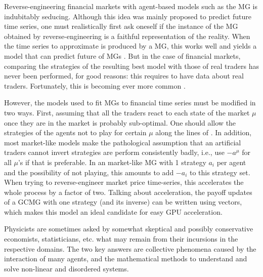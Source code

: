 \documentclass[aps,twocolumn,nofootinbib,sortedaddress,reprint]{revtex4-1}
\begin{document}
Reverse-engineering financial markets with agent-based models such as the MG is indubitably seducing. Although this idea was mainly proposed to predict future time series, one must realistically first ask oneself if the instance of the MG obtained by reverse-engineering is a faithful representation of the reality. When the time series to approximate is produced by a MG, this works well \cite{JohnsonLargeChanges} and yields a model that can predict future of MGs \cite{JohnsonLargeChanges,JohnsonPrediction}. But in the case of financial markets, comparing the strategies of the resulting best model with those of real traders has never been performed, for good reasons: this requires to have data about real traders. Fortunately, this is becoming ever more common \cite{MC10}.

However, the models used to fit MGs to financial time series must be modified in two ways. First, assuming that all the traders react to each state of the market $\mu$ once they are in the market is probably sub-optimal. One should allow the strategies of the agents not to play for certain $\mu$ along the lines of \citep{Piai}.  In addition, most market-like models make the pathological assumption that an artificial traders cannot invert strategies are perform consistently badly, i.e., use $-a^\mu$ for all $\mu$'s if that is preferable. In an market-like MG with 1 strategy $a_i$ per agent and the possibility of not playing, this amounts to add $-a_i$ to this strategy set. When trying to reverse-engineer market price time-series, this accelerates the whole process by a factor of two. Talking about acceleration, the payoff updates of a GCMG with one strategy  (and its inverse) can be written using vectors, which makes this model an ideal candidate for easy GPU acceleration.

Physicists are sometimes
asked by somewhat skeptical and possibly conservative economists,
statisticians, etc. what may remain from their incursions in the
respective domains. The two key answers are  collective phenomena
caused by the interaction of many agents, and the mathematical methods
to understand and solve non-linear and disordered
systems.
\end{document}
